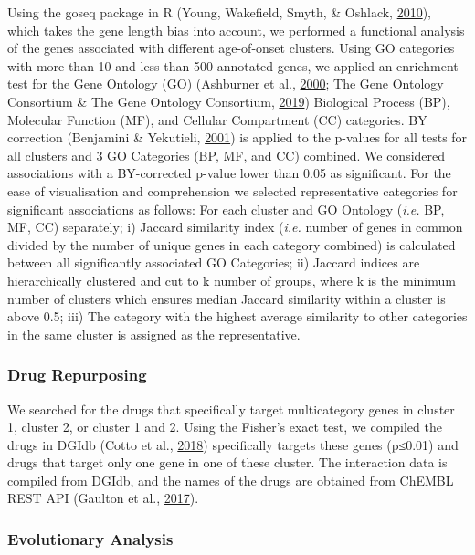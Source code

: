 \documentclass[12pt,twoside]{unicam}
\begin{document}
Using the goseq package in R (Young, Wakefield, Smyth, \& Oshlack, \protect\hyperlink{ref-Young2010}{2010}), which takes the gene length bias into account, we performed a functional analysis of the genes associated with different age-of-onset clusters. Using GO categories with more than 10 and less than 500 annotated genes, we applied an enrichment test for the Gene Ontology (GO) (Ashburner et al., \protect\hyperlink{ref-Ashburner2000}{2000}; The Gene Ontology Consortium \& The Gene Ontology Consortium, \protect\hyperlink{ref-The_Gene_Ontology_Consortium2019}{2019}) Biological Process (BP), Molecular Function (MF), and Cellular Compartment (CC) categories. BY correction (Benjamini \& Yekutieli, \protect\hyperlink{ref-Benjamini2001}{2001}) is applied to the p-values for all tests for all clusters and 3 GO Categories (BP, MF, and CC) combined. We considered associations with a BY-corrected p-value lower than 0.05 as significant. For the ease of visualisation and comprehension we selected representative categories for significant associations as follows: For each cluster and GO Ontology (\emph{i.e.} BP, MF, CC) separately; i) Jaccard similarity index (\emph{i.e.} number of genes in common divided by the number of unique genes in each category combined) is calculated between all significantly associated GO Categories; ii) Jaccard indices are hierarchically clustered and cut to k number of groups, where k is the minimum number of clusters which ensures median Jaccard similarity within a cluster is above 0.5; iii) The category with the highest average similarity to other categories in the same cluster is assigned as the representative.

\hypertarget{drug-repurposing}{%
\subsubsection{Drug Repurposing}\label{drug-repurposing}}

We searched for the drugs that specifically target multicategory genes in cluster 1, cluster 2, or cluster 1 and 2. Using the Fisher's exact test, we compiled the drugs in DGIdb (Cotto et al., \protect\hyperlink{ref-Cotto2018}{2018}) specifically targets these genes (p≤0.01) and drugs that target only one gene in one of these cluster. The interaction data is compiled from DGIdb, and the names of the drugs are obtained from ChEMBL REST API (Gaulton et al., \protect\hyperlink{ref-Gaulton2017}{2017}).

\hypertarget{evolutionary-analysis}{%
\subsubsection{Evolutionary Analysis}\label{evolutionary-analysis}}
\end{document}
